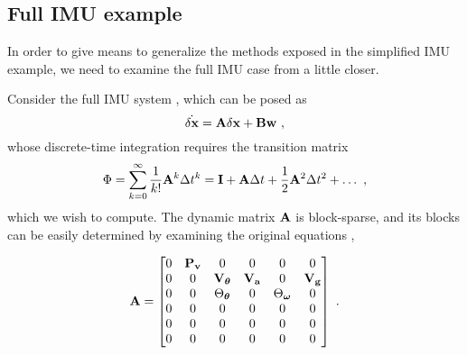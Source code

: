 \subsection{Full IMU example}
\label{sec:closedFormFullImu}

In order to give means to generalize the methods exposed in the simplified IMU example, we need to examine the full IMU case from a little closer.

Consider the full IMU system , which can be posed as
%
\begin{equation}
\dot{\delta{\bf x}} = {\bf A}\delta{\bf x} + {\bf B}{\bf w}~,
\end{equation}
%
whose discrete-time integration requires the transition matrix 
%
\begin{equation}
\Phi=\sum_{k=0}^\infty\frac{1}{k!}{\bf A}^k\Delta t^k = {\bf I} + {\bf A}\Delta t + \frac12{\bf A}^2\Delta t^2 + \dots~, \label{equ:tranmatseries}
\end{equation}
%
which we wish to compute. 
The dynamic matrix ${\bf A}$ is block-sparse, and its blocks can be easily determined by examining the original equations ,

%
\begin{equation}
{\bf A} = \begin{bmatrix}
  0& {\bf P}_{\bf v}&  0&  0&  0&  0\\
  0&  0& {\bf V}_{\bm \theta}& {\bf V}_{\bf a}&  0& {\bf V}_{\bf g}\\
  0&  0& \Theta_{\bm \theta}&  0& \Theta_{\bm \omega}
&  0\\
  0&  0&  0&  0&  0&  0\\
  0&  0&  0&  0&  0&  0\\
  0&  0&  0&  0&  0&  0
\end{bmatrix}~. \label{equ:FullIMU_Fmat}
\end{equation}
%

